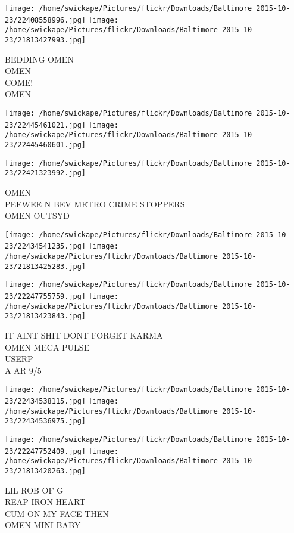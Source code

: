 \documentclass[10pt,letterpaper]{article}
\begin{document}
\texttt{[image: /home/swickape/Pictures/flickr/Downloads/Baltimore 2015-10-23/22408558996.jpg]}
\texttt{[image: /home/swickape/Pictures/flickr/Downloads/Baltimore 2015-10-23/21813427993.jpg]}

BEDDING OMEN\\
OMEN\\
COME!\\
OMEN\\
\pagebreak

\texttt{[image: /home/swickape/Pictures/flickr/Downloads/Baltimore 2015-10-23/22445461021.jpg]}
\texttt{[image: /home/swickape/Pictures/flickr/Downloads/Baltimore 2015-10-23/22445460601.jpg]}

\vspace{0.25in}
\texttt{[image: /home/swickape/Pictures/flickr/Downloads/Baltimore 2015-10-23/22421323992.jpg]}

OMEN\\
PEEWEE N BEV METRO CRIME STOPPERS\\
OMEN OUTSYD\\
\pagebreak

\texttt{[image: /home/swickape/Pictures/flickr/Downloads/Baltimore 2015-10-23/22434541235.jpg]}
\texttt{[image: /home/swickape/Pictures/flickr/Downloads/Baltimore 2015-10-23/21813425283.jpg]}

\texttt{[image: /home/swickape/Pictures/flickr/Downloads/Baltimore 2015-10-23/22247755759.jpg]}
\texttt{[image: /home/swickape/Pictures/flickr/Downloads/Baltimore 2015-10-23/21813423843.jpg]}

IT AINT SHIT DONT FORGET KARMA\\
OMEN MECA PULSE\\
USERP\\
A AR 9/5\\
\pagebreak

\texttt{[image: /home/swickape/Pictures/flickr/Downloads/Baltimore 2015-10-23/22434538115.jpg]}
\texttt{[image: /home/swickape/Pictures/flickr/Downloads/Baltimore 2015-10-23/22434536975.jpg]}

\texttt{[image: /home/swickape/Pictures/flickr/Downloads/Baltimore 2015-10-23/22247752409.jpg]}
\texttt{[image: /home/swickape/Pictures/flickr/Downloads/Baltimore 2015-10-23/21813420263.jpg]}

LIL ROB OF G\\
REAP IRON HEART\\
CUM ON MY FACE THEN\\
OMEN MINI BABY\\
\pagebreak
\end{document}
